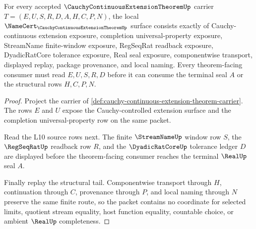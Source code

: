 \begin{theorem}
\label{thm:cauchy-continuous-extension-theorem-namecert-obligations}
For every accepted $\CauchyContinuousExtensionTheoremUp$ carrier $T=(E,U,S,R,D,A,H,C,P,N)$, the local $\NameCert_{\CauchyContinuousExtensionTheoremUp}$ surface consists exactly of Cauchy-continuous extension exposure, completion universal-property exposure, StreamName finite-window exposure, RegSeqRat readback exposure, DyadicRatCore tolerance exposure, Real seal exposure, componentwise transport, displayed replay, package provenance, and local naming. Every theorem-facing consumer must read $E,U,S,R,D$ before it can consume the terminal seal $A$ or the structural rows $H,C,P,N$.
\end{theorem}
\begin{proof}
Project the carrier of \autoref{def:cauchy-continuous-extension-theorem-carrier}. The rows $E$ and $U$ expose the Cauchy-controlled extension surface and the completion universal-property row on the same packet.

Read the L10 source rows next. The finite $\StreamNameUp$ window row $S$, the $\RegSeqRatUp$ readback row $R$, and the $\DyadicRatCoreUp$ tolerance ledger $D$ are displayed before the theorem-facing consumer reaches the terminal $\RealUp$ seal $A$.

Finally replay the structural tail. Componentwise transport through $H$, continuation through $C$, provenance through $P$, and local naming through $N$ preserve the same finite route, so the packet contains no coordinate for selected limits, quotient stream equality, host function equality, countable choice, or ambient $\RealUp$ completeness.
\end{proof}



